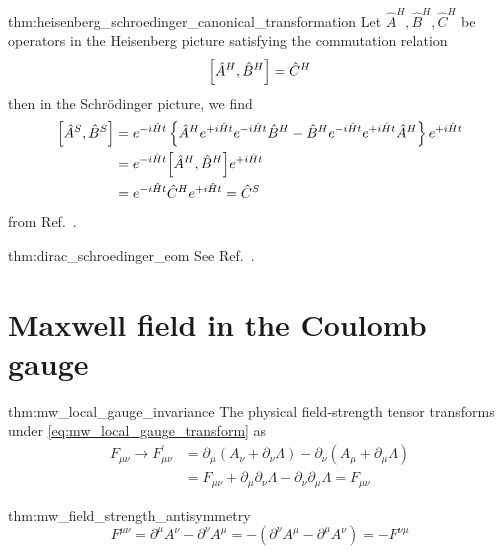 \begin{delayedproof}{thm:heisenberg_schroedinger_canonical_transformation}
	Let $\hat{A}^H,\hat{B}^H,\hat{C}^H$ be operators in the Heisenberg picture satisfying the commutation relation
	\begin{equation}
		\comm{\hat{A}^H}{\hat{B}^H}
		=
		\hat{C}^H
	\end{equation}
	then in the Schrödinger picture, we find
	\begin{equation}
		\begin{split}
			\comm{\hat{A}^S}{\hat{B}^S}
			&=
			e^{-i\hat{H}t}
			\left\{
				\hat{A}^H
				e^{+i\hat{H}t}
				e^{-i\hat{H}t}
				\hat{B}^H
				-	
				\hat{B}^H
				e^{-i\hat{H}t}
				e^{+i\hat{H}t}
				\hat{A}^H
			\right\}
			e^{+i\hat{H}t}
			\\
			&=
			e^{-i\hat{H}t}
			\comm{\hat{A}^H}{\hat{B}^H}
			e^{+i\hat{H}t}
			\\
			&=
			e^{-i\hat{H}t}
			\hat{C}^H
			e^{+i\hat{H}t}
			=
			\hat{C}^S
		\end{split}
	\end{equation}
	from Ref.~\cite[p.~213]{Greiner2013}.
\end{delayedproof}

\begin{delayedproof}{thm:dirac_schroedinger_eom}
	See Ref.~\cite[p.~214]{Greiner2013}.
\end{delayedproof}

\section{Maxwell field in the Coulomb gauge}

\begin{delayedproof}{thm:mw_local_gauge_invariance}
	The physical field-strength tensor transforms under \cref{eq:mw_local_gauge_transform} as
	\begin{equation*}
		\begin{split}
			F_{\mu\nu}
			\to
			F_{\mu\nu}^\prime
			&=
			\partial_\mu\left(A_\nu+\partial_\nu\Lambda\right)
			-
			\partial_\nu\left(A_\mu+\partial_\mu\Lambda\right)
			\\
			&=
			F_{\mu\nu}
			+
			\partial_\mu\partial_\nu\Lambda
			-
			\partial_\nu\partial_\mu\Lambda
			=
			F_{\mu\nu}
		\end{split}
	\end{equation*}	
\end{delayedproof}

\begin{delayedproof}{thm:mw_field_strength_antisymmetry}
	\begin{equation*}
		F^{\mu\nu}
		=
		\partial^\mu A^\nu
		-
		\partial^\nu A^\mu
		=
		-
		\left(
			\partial^\nu A^\mu
			-
			\partial^\mu A^\nu
		\right)
		=
		-
		F^{\nu\mu}
	\end{equation*}
\end{delayedproof}

